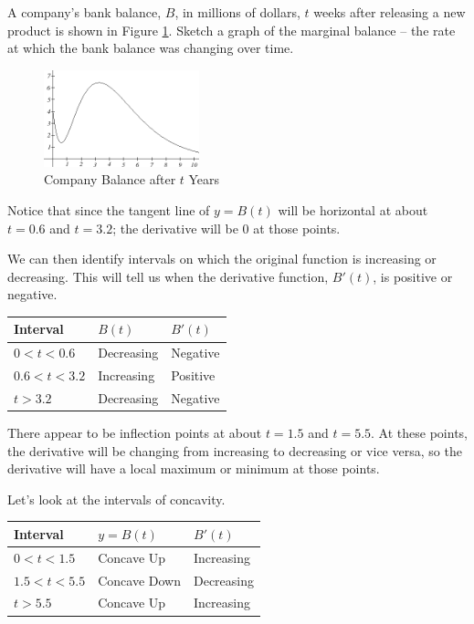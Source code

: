 \begin{example}
A company's bank balance, $B$, in millions of dollars, $t$ weeks after releasing a new product is shown in Figure \ref{fig:3-5-balance}. Sketch a graph of the marginal balance -- the rate at which the bank balance was changing over time.

\begin{figure}[!ht]
  \centering
    \includegraphics[width=0.4\textwidth]{img/chap3/image078.png}
    \caption{Company Balance after $t$ Years}
    \label{fig:3-5-balance}
\end{figure}

\begin{solution} Notice that since the tangent line of $y=B(t)$ will be horizontal at about $t=0.6$ and $t=3.2$; the derivative will be 0 at those points.

We can then identify intervals on which the original function is increasing or decreasing. This will tell us when the derivative function, $B'(t)$, is positive or negative.
\begin{table}[!ht]
    \centering
    \begin{tabular}{lll}
    \toprule 
    Interval	& $B(t)$        & $B'(t)$	\\
    \midrule 
    $0<t<0.6$   & Decreasing	& Negative	\\
    $0.6<t<3.2$ & Increasing	& Positive	\\
    $t>3.2$     & Decreasing	& Negative  \\
    \bottomrule
    \end{tabular}
\end{table}
There appear to be inflection points at about $t=1.5$ and $t=5.5$. At these points, the derivative will be changing from increasing to decreasing or vice versa, so the derivative will have a local maximum or minimum at those points.

Let's look at the intervals of concavity.
\begin{table}[!ht]
    \centering
    \begin{tabular}{lll}
    \toprule 
    Interval    & $y=B(t)$      & $B'(t)$ \\
    \midrule    
    $0<t<1.5$   & Concave Up    & Increasing \\
	$1.5<t<5.5$ & Concave Down	& Decreasing \\	
    $t>5.5$     & Concave Up	& Increasing \\
    \bottomrule
    \end{tabular}
\end{table}


\end{solution}
\end{example}
